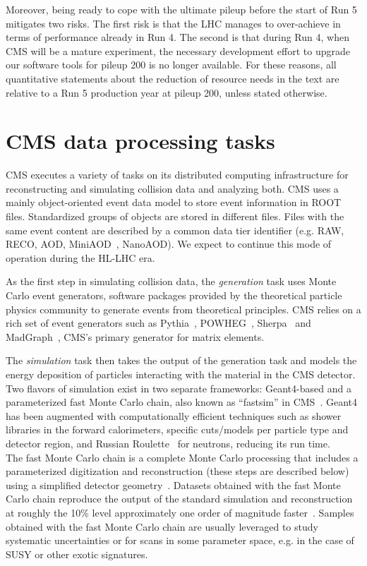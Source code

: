 \documentclass{cmspaper}
\begin{document}
Moreover, being ready to cope with the ultimate pileup before the start of Run 5 mitigates two risks. The first risk is that the LHC manages to over-achieve in terms of performance already in Run 4. The second is that during Run 4, when CMS will be a mature experiment, the necessary development effort to upgrade our software tools for pileup 200 is no longer available. For these reasons, all quantitative statements about the reduction of resource needs in the text are relative to a Run 5 production year at pileup 200, unless stated otherwise.

\section{CMS data processing tasks}
\label{sec:CMSDataProcessingTasks}
CMS executes a variety of tasks on its distributed computing infrastructure for reconstructing and simulating collision data and analyzing both. CMS uses a mainly object-oriented event data model to store event information in ROOT files. Standardized groups of objects are stored in different files. Files with the same event content are described by a common data tier identifier (e.g. RAW, RECO, AOD, MiniAOD~\cite{Petrucciani:2015gjw}, NanoAOD). We expect to continue this mode of operation during the HL-LHC era.

As the first step in simulating collision data, the {\it generation} task uses Monte Carlo event generators, software packages provided by the theoretical particle physics community to generate events from theoretical principles. CMS relies on a rich set of event generators such as Pythia~\cite{Sjostrand_2006}, POWHEG~\cite{Oleari_2010}, Sherpa~\cite{Bothmann_2019} and MadGraph~\cite{Alwall:1699128}, CMS’s primary generator for matrix elements. 

The {\it simulation} task then takes the output of the generation task and models the energy deposition of particles interacting with the material in the CMS detector. Two flavors of simulation exist in two separate frameworks: Geant4-based and a parameterized fast Monte Carlo chain, also known as ``fastsim'' in CMS~\cite{Abdullin:1328345}. Geant4 has been augmented with computationally efficient techniques such as shower libraries in the forward calorimeters, specific cuts/models per particle type and detector region, and Russian Roulette~\cite{Lange_2015, Hildreth:2017vpw} for neutrons, reducing its run time.\\
The fast Monte Carlo chain is a complete Monte Carlo processing that includes a parameterized digitization and reconstruction (these steps are described below) using a simplified detector geometry~\cite{Giammanco_2014}. Datasets obtained with the fast Monte Carlo chain reproduce the output of the standard simulation and reconstruction at roughly the 10\% level approximately one order of magnitude faster~\cite{Sekmen:2242542}. Samples obtained with the fast Monte Carlo chain are usually leveraged to study systematic uncertainties or for scans in some parameter space, e.g. in the case of SUSY or other exotic signatures.
\end{document}
